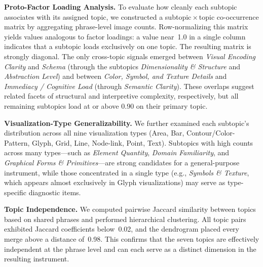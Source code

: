 \documentclass[journal]{IEEEtran}
\begin{document}
\textbf{Proto-Factor Loading Analysis.}
To evaluate how cleanly each subtopic associates with its assigned topic, we constructed a subtopic\,$\times$\,topic co-occurrence matrix by aggregating phrase-level image counts.
Row-normalizing this matrix yields values analogous to factor loadings: a value near~1.0 in a single column indicates that a subtopic loads exclusively on one topic.
The resulting matrix is strongly diagonal.
The only cross-topic signals emerged between \textit{Visual Encoding Clarity} and \textit{Schema} (through the subtopics \textit{Dimensionality \& Structure} and \textit{Abstraction Level}) and between \textit{Color, Symbol, and Texture Details} and \textit{Immediacy / Cognitive Load} (through \textit{Semantic Clarity}).
These overlaps suggest related facets of structural and interpretive complexity, respectively, but all remaining subtopics load at or above 0.90 on their primary topic.

\textbf{Visualization-Type Generalizability.}
We further examined each subtopic's distribution across all nine visualization types (Area, Bar, Contour/Color-Pattern, Glyph, Grid, Line, Node-link, Point, Text).
Subtopics with high counts across many types---such as \textit{Element Quantity}, \textit{Domain Familiarity}, and \textit{Graphical Forms \& Primitives}---are strong candidates for a general-purpose instrument, while those concentrated in a single type (e.g., \textit{Symbols \& Texture}, which appears almost exclusively in Glyph visualizations) may serve as type-specific diagnostic items.

\textbf{Topic Independence.}
We computed pairwise Jaccard similarity between topics based on shared phrases and performed hierarchical clustering.
All topic pairs exhibited Jaccard coefficients below~0.02, and the dendrogram placed every merge above a distance of~0.98.
This confirms that the seven topics are effectively independent at the phrase level and can each serve as a distinct dimension in the resulting instrument.
\end{document}
